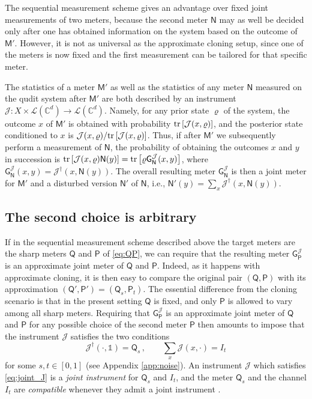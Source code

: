 \documentclass[12pt,reqno]{amsart}
\theoremstyle{definition}
\newcommand{\tr}[1]{{\rm tr}\left[#1\right]} %
\newcommand{\id}{\mathds{1}} %
\newcommand{\Mo}{\mathsf{M}}%
\newcommand{\Qo}{\mathsf{Q}}%
\newcommand{\Po}{\mathsf{P}}%
\newcommand{\No}{\mathsf{N}}%
\newcommand{\Go}{\mathsf{G}}%
\newcommand{\rhoo}{\varrho} %
\newcommand{\Cb}{\mathbb{C}} %
\newcommand{\lc}[1]{\mathcal{L}(\Cb^{#1})} %
\newcommand{\ii}{\mathcal{J}}
\begin{document}
The sequential measurement scheme gives an advantage over fixed joint measurements of two meters, because the second meter $\No$ may as well be decided only after one has obtained information on the system based on the outcome of $\Mo'$. 
However, it is not as universal as the approximate cloning setup, since one of the meters is now fixed and the first measurement can be tailored for that specific meter.

The statistics of a meter $\Mo'$ as well as the statistics of any meter $\No$ measured on the qudit system after $\Mo'$ are both described by an instrument $\ii:X\times\lc{d}\to\lc{d}$. Namely, for any prior state $\rhoo$ of the system, the outcome $x$ of $\Mo'$ is obtained with probability $\tr{\ii(x,\rhoo)}$, and the posterior state conditioned to $x$ is $\ii(x,\rhoo)/\tr{\ii(x,\rhoo)}$. Thus, if after $\Mo'$ we subsequently perform a measurement of $\No$, the probability of obtaining the outcomes $x$ and $y$ in succession is $\tr{\ii(x,\rhoo)\No(y)} = \tr{\rhoo\Go^\ii_\No(x,y)}$, where $\Go^\ii_\No(x,y) = \ii^\dag(x,\No(y))$. The overall resulting meter $\Go^\ii_\No$ is then a joint meter for $\Mo'$ and a disturbed version $\No'$ of $\No$, i.e., $\No'(y) = \sum_x\ii^\dag(x,\No(y))$.

\subsection{The second choice is arbitrary}\label{sec:s1}

If in the sequential measurement scheme described above the target meters are the sharp meters $\Qo$ and $\Po$ of \eqref{eq:QP}, we can require that the resulting meter $\Go^\ii_\Po$ is an approximate joint meter of $\Qo$ and $\Po$. Indeed, as it happens with approximate cloning, it is then easy to compare the original pair $(\Qo,\Po)$ with its approximation $(\Qo',\Po') = (\Qo_s,\Po_t)$. 
The essential difference from the cloning scenario is that in the present setting $\Qo$ is fixed, and only $\Po$ is allowed to vary among all sharp meters. Requiring that $\Go^\ii_\Po$ is an approximate joint meter of $\Qo$ and $\Po$ for any possible choice of the second meter $\Po$ then amounts to impose that the instrument $\ii$ satisfies the two conditions
\begin{equation}\label{eq:joint_J}
\ii^\dag(\cdot,\id) = \Qo_s\,,\qquad \sum_x \ii(x,\cdot) = I_t
\end{equation}
for some $s,t\in [0,1]$ (see Appendix \ref{app:noise}).
An instrument $\ii$ which satisfies \eqref{eq:joint_J} is a {\em joint instrument} for $\Qo_s$ and $I_t$, and the meter $\Qo_s$ and the channel $I_t$ are {\em compatible} whenever they admit a joint instrument \cite{HeMi13,HeMiRe14}.
\end{document}
